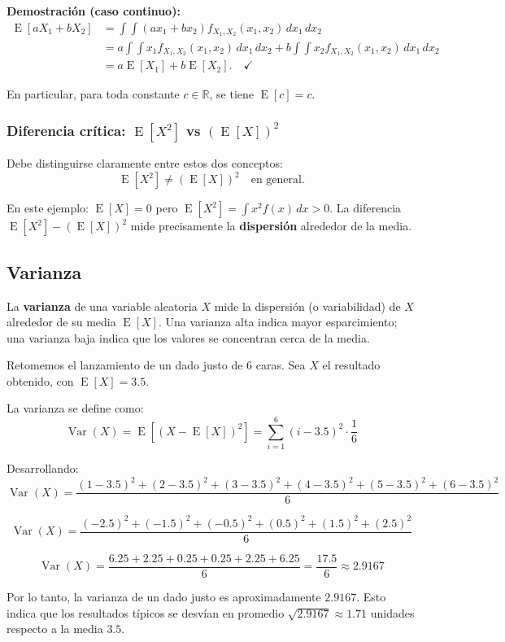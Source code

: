 \documentclass[11pt,a4paper]{article}
\DeclareMathOperator{\E}{E}
\DeclareMathOperator{\Var}{Var}
\begin{document}
\noindent\textbf{Demostración (caso continuo):}
\begin{align}
\E[aX_1+bX_2] &= \int\int (ax_1+bx_2)f_{X_1,X_2}(x_1,x_2)\,dx_1\,dx_2\\
&= a\int\int x_1 f_{X_1,X_2}(x_1,x_2)\,dx_1\,dx_2 + b\int\int x_2 f_{X_1,X_2}(x_1,x_2)\,dx_1\,dx_2\\
&= a\E[X_1]+b\E[X_2]. \quad\checkmark
\end{align}

En particular, para toda constante \(c\in\mathbb{R}\), se tiene \(\E[c]=c\).

\subsubsection*{Diferencia crítica: \(\E[X^2]\) vs \((\E[X])^2\)}

Debe distinguirse claramente entre estos dos conceptos:
\[
\boxed{\E[X^2]\neq (\E[X])^2 \quad \text{en general}}.
\]

\noindent En este ejemplo: \(\E[X]=0\) pero \(\E[X^2]=\int x^2 f(x)\,dx > 0\). La diferencia \(\E[X^2]-(\E[X])^2\) mide precisamente la \textbf{dispersión} alrededor de la media.

\subsection{Varianza}

\begin{concepto}
La \textbf{varianza} de una variable aleatoria \(X\) mide la dispersión (o variabilidad) de \(X\) alrededor de su media \(\E[X]\). Una varianza alta indica mayor esparcimiento; una varianza baja indica que los valores se concentran cerca de la media.
\end{concepto}

\begin{ejemplo}
Retomemos el lanzamiento de un dado justo de 6 caras. Sea \(X\) el resultado obtenido, con \(\E[X] = 3.5\).

La varianza se define como:
\[
\Var(X) = \E[(X - \E[X])^2] = \sum_{i=1}^{6} (i - 3.5)^2 \cdot \frac{1}{6}
\]

Desarrollando:
\[
\Var(X) = \frac{(1-3.5)^2 + (2-3.5)^2 + (3-3.5)^2 + (4-3.5)^2 + (5-3.5)^2 + (6-3.5)^2}{6}
\]

\[
\Var(X) = \frac{(-2.5)^2 + (-1.5)^2 + (-0.5)^2 + (0.5)^2 + (1.5)^2 + (2.5)^2}{6}
\]

\[
\Var(X) = \frac{6.25 + 2.25 + 0.25 + 0.25 + 2.25 + 6.25}{6} = \frac{17.5}{6} \approx 2.9167
\]

Por lo tanto, la varianza de un dado justo es aproximadamente \(2.9167\). Esto indica que los resultados típicos se desvían en promedio \( \sqrt{2.9167} \approx 1.71 \) unidades respecto a la media \(3.5\).
\end{ejemplo}
\end{document}
